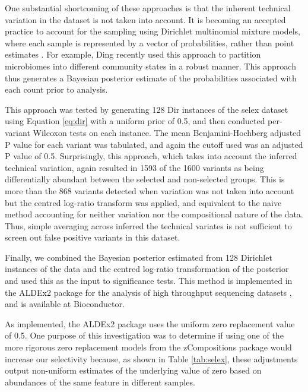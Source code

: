 \documentclass[article]{ajs}\usepackage[]{graphicx}\usepackage[]{color}
\begin{document}
One substantial  shortcoming of these approaches is that the inherent technical variation in the dataset is not taken into account. It is becoming an accepted practice to account for the sampling using  Dirichlet multinomial mixture models, where each sample is represented by a vector of probabilities, rather than point estimates \citep{Holmes:2012}. For example, Ding \citeyear{Ding:2014aa} recently used this approach to  partition microbiomes into different community states in a robust manner. This approach thus generates a Bayesian posterior estimate of the probabilities associated with each count prior to analysis.

This approach was tested by generating 128 Dir instances of the selex dataset using Equation \ref{eq:dir} with a uniform prior of 0.5, and then conducted per-variant Wilcoxon tests on each instance. The mean Benjamini-Hochberg adjusted P value for each variant was tabulated, and again the cutoff used was an adjusted P value of 0.5. Surprisingly, this approach, which takes into account the inferred technical variation, again resulted in 1593 of the 1600 variants as being differentially abundant between the selected and non-selected groups. This is more than the 868 variants detected when variation was not taken into account but the centred log-ratio transform was applied, and equivalent to the naive method accounting for neither variation nor the compositional nature of the data. Thus, simple averaging across inferred the technical variates is not sufficient to screen out false positive variants in this dataset. 

Finally, we combined the Bayesian posterior estimated from 128 Dirichlet instances of the data and the centred log-ratio transformation of the posterior and used this as the input to significance tests.  This method is implemented in the ALDEx2  package for the analysis of high throughput sequencing datasets \citep{fernandes:2013,fernandes:2014}, and is available at Bioconductor. 

As implemented, the ALDEx2 package uses the uniform zero replacement value of 0.5. One purpose of this investigation was to determine if using one of the more rigorous zero replacement models from the zCompositions package would increase our selectivity because, as shown in Table \ref{tab:selex}, these adjustments output non-uniform estimates of the underlying value of zero based on abundances of the same feature in different samples. 
\end{document}
